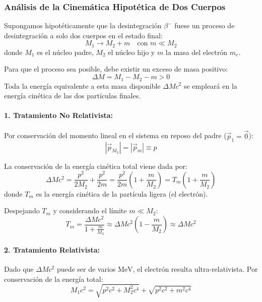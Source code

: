 \newpage
\subsubsection{Análisis de la Cinemática Hipotética de Dos Cuerpos}

Supongamos hipotéticamente que la desintegración $\beta^-$ fuese un proceso de desintegración a solo dos cuerpos en el estado final:
\begin{equation}
M_1 \longrightarrow M_2 + m \quad \text{con } m \ll M_2
\end{equation}
donde $M_1$ es el núcleo padre, $M_2$ el núcleo hijo y $m$ la masa del electrón $m_e$.

Para que el proceso sea posible, debe existir un exceso de masa positivo:
\begin{equation}
\Delta M = M_1 - M_2 - m > 0
\end{equation}
Toda la energía equivalente a esta masa disponible $\Delta M c^2$ se empleará en la energía cinética de las dos partículas finales.

\paragraph{1. Tratamiento No Relativista:}
Por conservación del momento lineal en el sistema en reposo del padre ($\vec{p}_1 = \vec{0}$):
\begin{equation}
|\vec{p}_{M_2}| = |\vec{p}_m| \equiv p
\end{equation}

La conservación de la energía cinética total viene dada por:
\begin{equation}
\Delta M c^2 = \frac{p^2}{2 M_2} + \frac{p^2}{2 m} = \frac{p^2}{2m} \left( 1 + \frac{m}{M_2} \right) = T_m \left( 1 + \frac{m}{M_2} \right)
\end{equation}
donde $T_m$ es la energía cinética de la partícula ligera (el electrón).

Despejando $T_m$ y considerando el límite $m \ll M_2$:
\begin{equation}
T_m = \frac{\Delta M c^2}{1 + \frac{m}{M_2}} \approx \Delta M c^2 \left( 1 - \frac{m}{M_2} \right) \approx \Delta M c^2
\end{equation}

\paragraph{2. Tratamiento Relativista:}
Dado que $\Delta M c^2$ puede ser de varios $\text{MeV}$, el electrón resulta ultra-relativista. Por conservación de la energía total:
\begin{equation}
M_1 c^2 = \sqrt{p^2 c^2 + M_2^2 c^4} + \sqrt{p^2 c^2 + m^2 c^4}
\end{equation}


